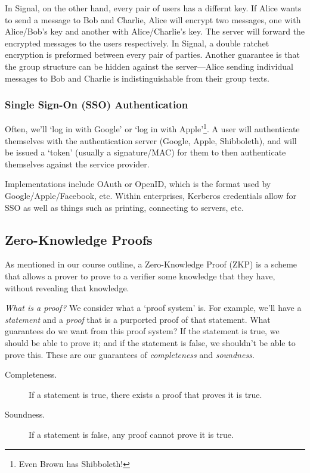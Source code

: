 
In Signal, on the other hand, every pair of users has a differnt key. If Alice wants to send a message to Bob and Charlie, Alice will encrypt two messages, one with Alice/Bob's key and another with Alice/Charlie's key. The server will forward the encrypted messages to the users respectively. In Signal, a double ratchet encryption is preformed between every pair of parties. Another guarantee is that the group structure can be hidden against the server---Alice sending individual messages to Bob and Charlie is indistinguishable from their group texts.


\subsubsection{Single Sign-On (SSO) Authentication}
Often, we'll `log in with Google' or `log in with Apple'\footnote{Even Brown has Shibboleth!}. A user will authenticate themselves with the authentication server (Google, Apple, Shibboleth), and will be issued a `token' (usually a signature/MAC) for them to then authenticate themselves against the service provider.

Implementations include OAuth or OpenID, which is the format used by Google/Apple/Facebook, etc. Within enterprises, Kerberos credentials allow for SSO as well as things such as printing, connecting to servers, etc.


\subsection{Zero-Knowledge Proofs}

As mentioned in our course outline, a Zero-Knowledge Proof (ZKP) is a scheme that allows a prover to prove to a verifier some knowledge that they have, without revealing that knowledge.

\emph{What is a proof?} We consider what a `proof system' is. For example, we'll have a \emph{statement} and a \emph{proof} that is a purported proof of that statement. What guarantees do we want from this proof system? If the statement is true, we should be able to prove it; and if the statement is false, we shouldn't be able to prove this. These are our guarantees of \emph{completeness} and \emph{soundness}.
\begin{description}
    \item[Completeness.] If a statement is true, there exists a proof that proves it is true.
    \item[Soundness.] If a statement is false, any proof cannot prove it is true.
\end{description}

